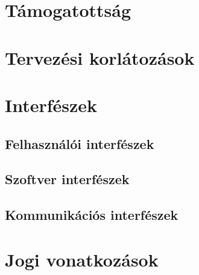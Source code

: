 \section{Támogatottság}

\section{Tervezési korlátozások}

\section{Interfészek}
\subsection{Felhasználói interfészek}
\subsection{Szoftver interfészek}
\subsection{Kommunikációs interfészek}

\section{Jogi vonatkozások}
